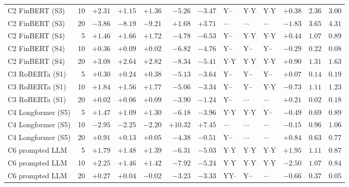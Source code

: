 \begin{table}[p]
\begin{tabular}{@{}lrrrrrrlllrrr@{}}
C2 FinBERT (S3) & 10 & $+2.31$ & $+1.15$ & $+1.36$ & $-5.26$ & $-3.47$ & Y$\cdot$$\cdot$ & Y$\cdot$Y & Y$\cdot$Y & $+0.38$ & $2.36$ & $3.00$ \\
C2 FinBERT (S3) & 20 & $-3.86$ & $-8.19$ & $-9.21$ & $+1.68$ & $+3.71$ & $\cdot$$\cdot$$\cdot$ & $\cdot$$\cdot$$\cdot$ & $\cdot$$\cdot$$\cdot$ & $-1.83$ & $3.65$ & $4.31$ \\
\addlinespace
C2 FinBERT (S4) & 5 & $+1.46$ & $+1.66$ & $+1.72$ & $-4.78$ & $-6.53$ & Y$\cdot$$\cdot$ & Y$\cdot$Y & Y$\cdot$Y & $+0.44$ & $1.07$ & $0.89$ \\
C2 FinBERT (S4) & 10 & $+0.36$ & $+0.09$ & $+0.02$ & $-6.82$ & $-4.76$ & Y$\cdot$$\cdot$ & Y$\cdot$$\cdot$ & Y$\cdot$$\cdot$ & $-0.29$ & $0.22$ & $0.08$ \\
C2 FinBERT (S4) & 20 & $+3.08$ & $+2.64$ & $+2.82$ & $-8.34$ & $-5.41$ & Y$\cdot$Y & Y$\cdot$Y & Y$\cdot$Y & $+0.90$ & $1.31$ & $1.63$ \\
\addlinespace
C3 RoBERTa (S1) & 5 & $+0.30$ & $+0.24$ & $+0.38$ & $-5.13$ & $-3.64$ & Y$\cdot$$\cdot$ & Y$\cdot$$\cdot$ & Y$\cdot$$\cdot$ & $+0.07$ & $0.14$ & $0.19$ \\
C3 RoBERTa (S1) & 10 & $+1.84$ & $+1.56$ & $+1.77$ & $-5.06$ & $-3.34$ & Y$\cdot$$\cdot$ & Y$\cdot$$\cdot$ & Y$\cdot$Y & $-0.73$ & $1.11$ & $1.23$ \\
C3 RoBERTa (S1) & 20 & $+0.02$ & $+0.06$ & $+0.09$ & $-3.90$ & $-1.24$ & Y$\cdot$$\cdot$ & $\cdot$$\cdot$$\cdot$ & $\cdot$$\cdot$$\cdot$ & $+0.21$ & $0.02$ & $0.18$ \\
\addlinespace
C4 Longformer (S5) & 5 & $+1.47$ & $+1.09$ & $+1.30$ & $-6.18$ & $-3.96$ & Y$\cdot$Y & Y$\cdot$Y & Y$\cdot$$\cdot$ & $-0.49$ & $0.69$ & $0.89$ \\
C4 Longformer (S5) & 10 & $-2.95$ & $-2.25$ & $-2.20$ & $+10.32$ & $+7.45$ & $\cdot$$\cdot$$\cdot$ & $\cdot$$\cdot$$\cdot$ & $\cdot$$\cdot$$\cdot$ & $-0.15$ & $0.96$ & $1.06$ \\
C4 Longformer (S5) & 20 & $+0.91$ & $+0.13$ & $+0.05$ & $-4.38$ & $-0.51$ & Y$\cdot$$\cdot$ & $\cdot$$\cdot$$\cdot$ & $\cdot$$\cdot$$\cdot$ & $+0.84$ & $0.63$ & $0.77$ \\
\addlinespace
C6 prompted LLM & 5 & $+1.79$ & $+1.48$ & $+1.39$ & $-6.31$ & $-5.03$ & Y$\cdot$Y & Y$\cdot$Y & Y$\cdot$Y & $+1.95$ & $1.11$ & $0.87$ \\
C6 prompted LLM & 10 & $+2.25$ & $+1.46$ & $+1.42$ & $-7.92$ & $-5.24$ & Y$\cdot$Y & Y$\cdot$Y & Y$\cdot$Y & $-2.50$ & $1.07$ & $0.84$ \\
C6 prompted LLM & 20 & $+0.27$ & $+0.04$ & $-0.02$ & $-3.23$ & $-3.33$ & YY$\cdot$ & Y$\cdot$$\cdot$ & $\cdot$$\cdot$$\cdot$ & $-0.66$ & $0.37$ & $0.05$ \\

\end{tabular}
\end{table}
